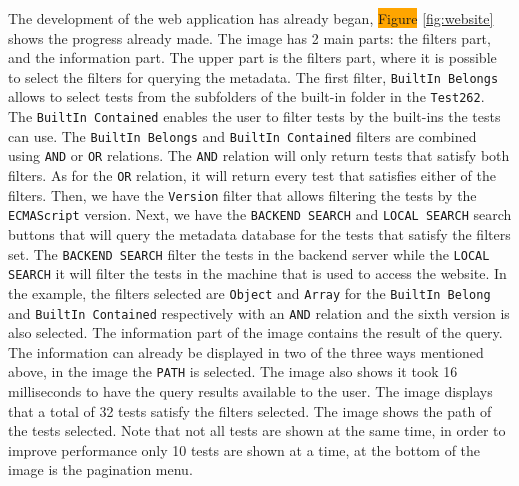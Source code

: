 \documentclass[runningheads]{llncs}
\begin{document}
The development of the web application has already began, \colorbox{orange}{Figure} \ref{fig:website} shows the progress already made. The image has 2 main parts: the filters part, and the information part.
%
The upper part is the filters part, where it is possible to select the filters for querying the metadata. The first filter, \texttt{BuiltIn Belongs} allows to select tests from the subfolders of the built-in folder in the \texttt{Test262}. The \texttt{BuiltIn Contained} enables the user to filter tests by the built-ins the tests can use.
%
The \texttt{BuiltIn Belongs} and \texttt{BuiltIn Contained} filters are combined using \texttt{AND} or \texttt{OR} relations. The \texttt{AND} relation will only return tests that satisfy both filters. As for the \texttt{OR} relation, it will return every test that satisfies either of the filters.
%
Then, we have the \texttt{Version} filter that allows filtering the tests by the \texttt{ECMAScript} version. Next, we have the \texttt{BACKEND SEARCH} and \texttt{LOCAL SEARCH} search buttons that will query the metadata database for the tests that satisfy the filters set. The \texttt{BACKEND SEARCH} filter the tests in the backend server while the \texttt{LOCAL SEARCH} it will filter the tests in the machine that is used to access the website.
%
In the example, the filters selected are \texttt{Object}  and \texttt{Array} for the \texttt{BuiltIn Belong} and \texttt{BuiltIn Contained} respectively with an \texttt{AND} relation and the sixth version is also selected.
%
The information part of the image contains the result of the query. The information can already be displayed in two of the three ways mentioned above, in the image the \texttt{PATH} is selected. The image also shows it took 16 milliseconds to have the query results available to the user. The image displays that a total of 32 tests satisfy the filters selected. The image shows the path of the tests selected. Note that not all tests are shown at the same time, in order to improve performance only 10 tests are shown at a time, at the bottom of the image is the pagination menu.
\end{document}
